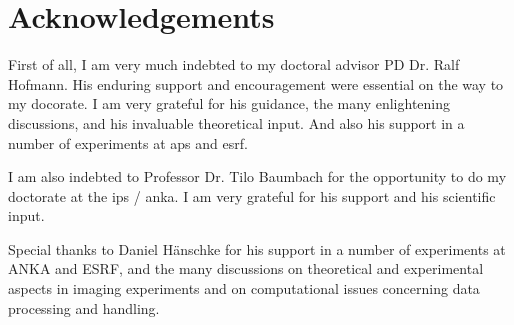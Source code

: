 \documentclass[
twoside,
openright,
titlepage,
numbers=noenddot,
headinclude,
fleqn,
a4paper,
footinclude=true,
cleardoublepage=empty,
abstractoff,
BCOR=5mm,
paper=a4,
fontsize=11pt,
british,ngerman,american,
]{scrreprt}
\begin{document}
\manualmark
\markboth{\spacedlowsmallcaps{\bibname}}{\spacedlowsmallcaps{\bibname}}
{}
\label{app:bibliography} 
%
%


\begingroup
\raggedright
\sloppy
\printbibliography
\endgroup
\cleardoublepage

\begingroup
\let\clearpage\relax
\let\cleardoublepage\relax
\let\cleardoublepage\relax
\chapter*{Acknowledgements}
\thispagestyle{empty}
\pagestyle{empty}
\manualmark
{}
{}
{}

\sloppy

First of all, I am very much indebted to my doctoral advisor PD
Dr. Ralf Hofmann.  His enduring support and encouragement were
essential on the way to my docorate.  I am very grateful for his
guidance, the many enlightening discussions, and his invaluable
theoretical input.  And also his support in a number of experiments at
\ac{aps} and \ac{esrf}.

I am also indebted to Professor Dr. Tilo Baumbach for the opportunity
to do my doctorate at the \ac{ips} / \ac{anka}.  I am very grateful
for his support and his scientific input.

Special thanks to Daniel Hänschke for his support in a number of
experiments at ANKA and ESRF, and the many discussions on 
theoretical and experimental aspects in imaging experiments and on
computational issues concerning data processing and handling.
\end{document}
